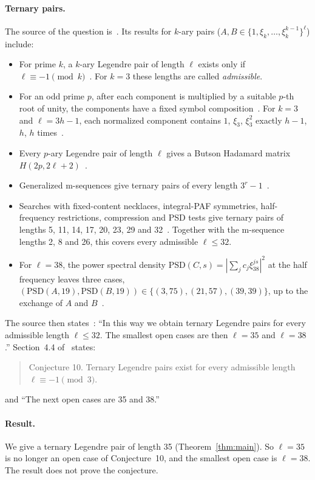 \documentclass[11pt]{article}
\theoremstyle{remark}
\begin{document}
\paragraph{Ternary pairs.} The source of the question is~\cite{KLW}. Its results for $k$-ary pairs ($A, B \in \{1, \xi_k, \dots, \xi_k^{k-1}\}^\ell$) include:
\begin{itemize}
  \item For prime $k$, a $k$-ary Legendre pair of length $\ell$ exists only if $\ell \equiv -1 \pmod k$~\cite[Theorem~1]{KLW}. For $k = 3$ these lengths are called \emph{admissible}.
  \item For an odd prime $p$, after each component is multiplied by a suitable $p$-th root of unity, the components have a fixed symbol composition~\cite[Theorem~4]{KLW}. For $k = 3$ and $\ell = 3h - 1$, each normalized component contains $1$, $\xi_3$, $\xi_3^2$ exactly $h-1$, $h$, $h$ times~\cite[Section~4]{KLW}.
  \item Every $p$-ary Legendre pair of length $\ell$ gives a Butson Hadamard matrix $H(2p, 2\ell + 2)$~\cite[Corollary~6]{KLW}.
  \item Generalized m-sequences give ternary pairs of every length $3^r - 1$~\cite[Section~2.3]{KLW}.
  \item Searches with fixed-content necklaces, integral-PAF symmetries, half-frequency restrictions, compression and PSD tests give ternary pairs of lengths 5, 11, 14, 17, 20, 23, 29 and 32~\cite[Section~4, Appendix~A]{KLW}. Together with the m-sequence lengths 2, 8 and 26, this covers every admissible $\ell \le 32$.
  \item For $\ell = 38$, the power spectral density $\mathrm{PSD}(C, s) = |\sum_j c_j \xi_{38}^{js}|^2$ at the half frequency leaves three cases, $(\mathrm{PSD}(A,19), \mathrm{PSD}(B,19)) \in \{(3,75), (21,57), (39,39)\}$, up to the exchange of $A$ and $B$~\cite[Section~4.4]{KLW}.
\end{itemize}
The source then states~\cite[Section~1]{KLW}: ``In this way we obtain ternary Legendre pairs for every admissible length $\ell \le 32$. The smallest open cases are then $\ell = 35$ and $\ell = 38$.'' Section~4.4 of~\cite{KLW} states:
\begin{quote}
Conjecture 10. Ternary Legendre pairs exist for every admissible length $\ell \equiv -1 \pmod 3$.
\end{quote}
and ``The next open cases are 35 and 38.''

\paragraph{Result.} We give a ternary Legendre pair of length 35 (Theorem~\ref{thm:main}). So $\ell = 35$ is no longer an open case of Conjecture~10, and the smallest open case is $\ell = 38$. The result does not prove the conjecture.
\end{document}
